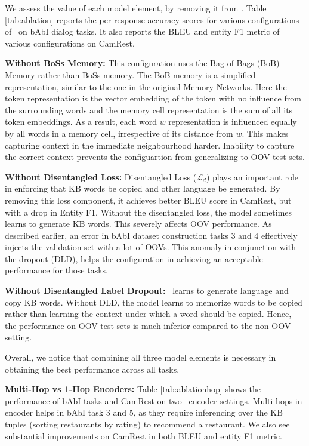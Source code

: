 We assess the value of each model element, by removing it from \sys. Table \ref{tab:ablation} reports the per-response accuracy scores for various configurations of \sys\ on bAbI dialog tasks. It also reports the BLEU and entity F1 metric of various configurations on CamRest.

\noindent \textbf{Without BoSs Memory:} 
This configuration uses the Bag-of-Bags (BoB) Memory rather than {\sc BoSs} memory. The BoB memory is a simplified representation, similar to the one in the original Memory Networks. Here the token representation is the vector embedding of the token with no influence from the surrounding words and the memory cell representation is the sum of all its token embeddings. As a result, each word $w$ representation is influenced equally by all words in a memory cell, irrespective of its distance from $w$. This makes capturing context in the immediate neighbourhood harder. Inability to capture the correct context prevents the configuartion from generalizing to OOV test sets.

\noindent \textbf{Without Disentangled Loss:} Disentangled Loss ($\mathcal{L}_{d}$) plays an important role in enforcing that KB words be copied and other language be generated. By removing this loss component, 
it achieves better BLEU score in CamRest, but with a drop in Entity F1. Without the disentangled loss, the model sometimes learns to generate KB words. This severely affects OOV performance. As described earlier, an error in bAbI dataset construction tasks 3 and 4 effectively injects the validation set with a lot of OOVs. This anomaly in conjunction with the dropout (DLD), helps the configuration in achieving an acceptable performance for those tasks.

\noindent \textbf{Without Disentangled Label Dropout:} 
\sys\ learns to generate language and copy KB words. Without DLD, the model learns to memorize words to be copied rather than learning the context under which a word should be copied. Hence, the performance on OOV test sets is much inferior compared to the non-OOV setting.

Overall, we notice that combining all three model elements is necessary in obtaining the best performance across all tasks.

\noindent \textbf{Multi-Hop vs 1-Hop Encoders:}
Table \ref{tab:ablationhop} shows the performance of bAbI tasks and CamRest on two \sys\ encoder settings. Multi-hops in encoder helps in bAbI task 3 and 5, as they require inferencing over the KB tuples (sorting restaurants by rating) to recommend a restaurant. We also see substantial improvements on CamRest in both BLEU and entity F1 metric.


